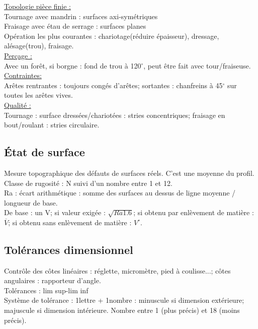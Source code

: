 \documentclass[../main.tex]{subfiles}
\begin{document}
\quad \underline{Topologie pièce finie :}\\
Tournage avec mandrin : surfaces axi-symétriques\\
Fraisage avec étau de serrage : surfaces planes\\
Opération les plus courantes : chariotage(réduire épaisseur), dressage, alésage(trou), fraisage.\\

\quad \underline{Perçage :}\\
Avec un forêt, si borgne : fond de trou à 120$^{\circ}$, peut être fait avec tour/fraiseuse.\\

\quad \underline{Contraintes:}\\
 Arêtes rentrantes : toujours congés d'arêtes; sortantes : chanfreins à 45$^{\circ}$ sur toutes les arêtes vives.\\

\quad \underline{Qualité :}\\
Tournage : surface dressées/chariotées : stries concentriques; fraisage en bout/roulant : stries circulaire. \\

\subsection{État de surface}
Mesure topographique des défauts de surfaces réels. C'est une moyenne du profil. \\
Classe de rugosité : N suivi d'un nombre entre 1 et 12. \\
Ra : écart arithmétique : somme des surfaces au dessus de ligne moyenne / longueur de base.\\
De base : un V; si valeur exigée : $\sqrt{Ra 1.6}$; si obtenu par enlèvement de matière : $\overline{V}$; si obtenu sans enlèvement de matière : $V^{\circ}$.\\

\subsection{Tolérances dimensionnel}
Contrôle des côtes linéaires : réglette, micromètre, pied à coulisse...; côtes angulaires : rapporteur d'angle. \\
Tolérances : lim sup-lim inf\\
Système de tolérance : 1lettre + 1nombre : minuscule si dimension extérieure; majuscule si dimension intérieure. Nombre entre 1 (plus précis) et 18 (moins précis).\\
\end{document}
